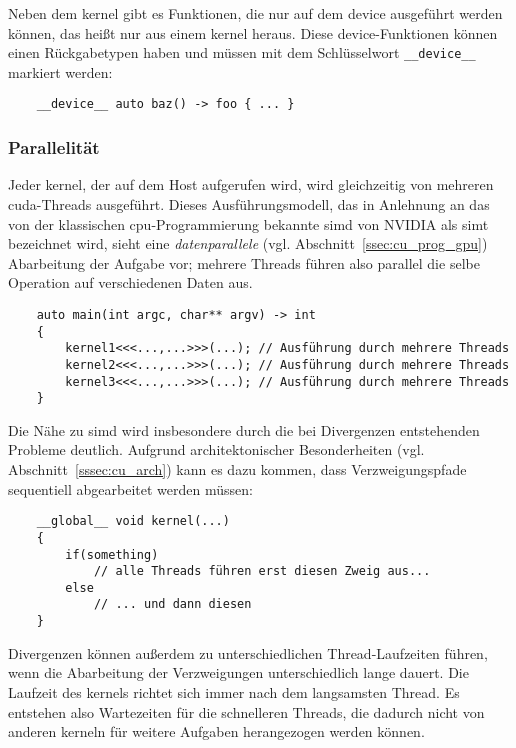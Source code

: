 Neben dem \gls{kernel} gibt es Funktionen, die nur auf dem \gls{device} ausgeführt werden können, das heißt nur aus
einem \gls{kernel} heraus. Diese \gls{device}-Funktionen können einen Rückgabetypen haben und müssen mit dem
Schlüsselwort \texttt{\_\_device\_\_} markiert werden:

\begin{verbatim}
    __device__ auto baz() -> foo { ... }
\end{verbatim}

\subsubsection{Parallelität}

Jeder \gls{kernel}, der auf dem Host aufgerufen wird, wird gleichzeitig von mehreren \gls{cuda}-Threads ausgeführt.
Dieses Ausführungsmodell, das in Anlehnung an das von der klassischen \gls{cpu}-Programmierung bekannte \gls{simd} von
NVIDIA{\textregistered} als \gls{simt} bezeichnet wird, sieht eine \textit{datenparallele} (vgl.
Abschnitt~\ref{ssec:cu_prog_gpu}) Abarbeitung der Aufgabe vor; mehrere Threads führen also parallel die selbe
Operation auf verschiedenen Daten aus.

\begin{verbatim}
    auto main(int argc, char** argv) -> int
    {
        kernel1<<<...,...>>>(...); // Ausführung durch mehrere Threads
        kernel2<<<...,...>>>(...); // Ausführung durch mehrere Threads
        kernel3<<<...,...>>>(...); // Ausführung durch mehrere Threads
    }
\end{verbatim}

Die Nähe zu \gls{simd} wird insbesondere durch die bei Divergenzen entstehenden Probleme deutlich. Aufgrund
architektonischer Besonderheiten (vgl. Abschnitt~\ref{sssec:cu_arch}) kann es dazu kommen, dass Verzweigungspfade
sequentiell abgearbeitet werden müssen:

\begin{verbatim}
    __global__ void kernel(...)
    {
        if(something)
            // alle Threads führen erst diesen Zweig aus...
        else
            // ... und dann diesen
    }
\end{verbatim}

Divergenzen können außerdem zu unterschiedlichen Thread-Laufzeiten führen, wenn die Abarbeitung der Verzweigungen
unterschiedlich lange dauert. Die Laufzeit des \gls{kernel}s richtet sich immer nach dem langsamsten Thread. Es
entstehen also Wartezeiten für die schnelleren Threads, die dadurch nicht von anderen \gls{kernel}n für weitere Aufgaben
herangezogen werden können.

